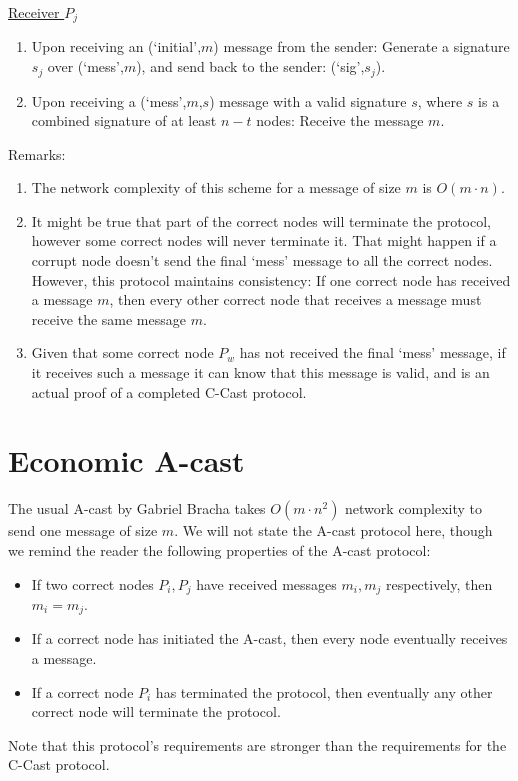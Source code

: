 \uline{Receiver $P_j$}
\begin{enumerate}
  \item Upon receiving an (`initial',$m$) message from the sender: Generate a
    signature $s_j$ over (`mess',$m$), and send back to the sender:
    (`sig',$s_j$).
  \item Upon receiving a (`mess',$m$,$s$) message with a valid signature $s$,
    where $s$ is a combined signature of at least $n-t$ nodes: Receive the
    message $m$.
\end{enumerate}

Remarks:
\begin{enumerate}
  \item The network complexity of this scheme for a message of size
    $m$ is $O(m \cdot n)$.
  \item It might be true that part of the correct nodes will terminate the
    protocol, however some correct nodes will never terminate it. That might
    happen if a corrupt node doesn't send the final `mess' message to all the
    correct nodes. However, this protocol maintains consistency: If one correct
    node has received a message $m$, then every other correct node that receives
    a message must receive the same message $m$.
  \item Given that some correct node $P_w$ has not received the final `mess'
    message, if it receives such a message it can know that this message is
    valid, and is an actual proof of a completed C-Cast protocol.
\end{enumerate}

\section{Economic A-cast}

The usual A-cast by Gabriel Bracha takes $O(m\cdot n^2)$ network complexity to
send one message of size $m$. We will not state the A-cast protocol here, though
we remind the reader the following properties of the A-cast protocol:
\begin{itemize}
  \item If two correct nodes $P_i,P_j$ have received messages $m_i,m_j$
    respectively, then $m_i = m_j$.
  \item If a correct node has initiated the A-cast, then every node eventually
    receives a message.
  \item If a correct node $P_i$ has terminated the protocol, then eventually any
    other correct node will terminate the protocol.
\end{itemize}
Note that this protocol's requirements are stronger than the requirements
for the C-Cast protocol.

